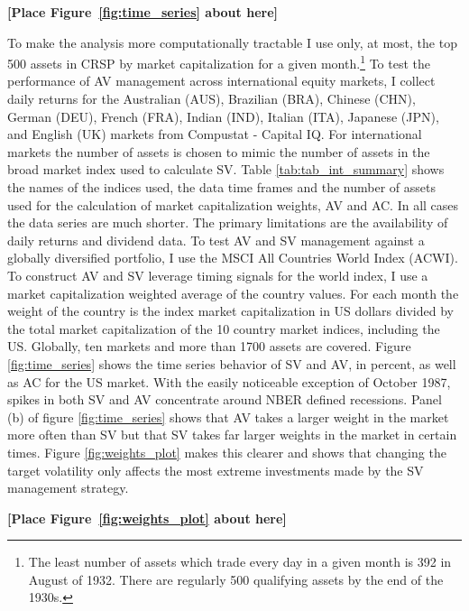 \bigskip
\centerline{\bf [Place Figure~\ref{fig:time_series} about here]}
\bigskip
To make the analysis more computationally tractable I use only, at most, the top 500 assets in CRSP by market capitalization for a given month.\footnote{The least number of assets which trade every day in a given month is 392 in August of 1932. There are regularly 500 qualifying assets by the end of the 1930s.} To test the performance of AV management across international equity markets, I collect daily returns for the Australian (AUS), Brazilian (BRA), Chinese (CHN), German (DEU), French (FRA), Indian (IND), Italian (ITA), Japanese (JPN), and English (UK) markets from Compustat - Capital IQ. For international markets the number of assets is chosen to mimic the number of assets in the broad market index used to calculate SV.  Table \ref{tab:tab_int_summary} shows the names of the indices used, the data time frames and the number of assets used for the calculation of market capitalization weights, AV and AC. In all cases the data series are much shorter. The primary limitations are the availability of daily returns and dividend data. To test AV and SV management against a globally diversified portfolio, I use the MSCI All Countries World Index (ACWI). To construct AV and SV leverage timing signals for the world index, I use a market capitalization weighted average of the country values. For each month the weight of the country is the index market capitalization in US dollars divided by the total market capitalization of the 10 country market indices, including the US. Globally, ten markets and more than 1700 assets are covered. 
Figure \ref{fig:time_series} shows the time series behavior of SV and AV, in percent, as well as
AC for the US market. With the easily noticeable exception of October 1987, spikes in both SV and AV concentrate around NBER defined recessions. Panel (b) of figure \ref{fig:time_series} shows that AV takes a larger weight in the market more often than SV but that SV takes far larger weights in the market in certain times. Figure \ref{fig:weights_plot} makes this clearer and shows that changing the target volatility only affects the most extreme investments made by the SV management strategy.\\
\bigskip
\centerline{\bf [Place Figure~\ref{fig:weights_plot} about here]}
\bigskip


